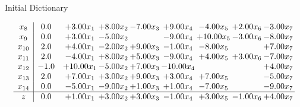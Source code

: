 \documentclass[8pt]{article}
\begin{document}
Initial Dictionary 

\[\begin{array}{c| c c@{\hskip 2pt} c@{\hskip 2pt} c@{\hskip 2pt} c@{\hskip 2pt} c@{\hskip 2pt} c@{\hskip 2pt} c@{\hskip 2pt} }
 x_{8}   &  0.0 & +  3.00 x_{1} & +  8.00 x_{2} & -7.00 x_{3} & +  9.00 x_{4} & -4.00 x_{5} & +  2.00 x_{6} & -3.00 x_{7}\\
 x_{9}   &  0.0 & +  3.00 x_{1} & -5.00 x_{2} &   & -9.00 x_{4} & + 10.00 x_{5} & -3.00 x_{6} & -8.00 x_{7}\\
 x_{10}   &  2.0 & +  4.00 x_{1} & -2.00 x_{2} & +  9.00 x_{3} & -1.00 x_{4} & -8.00 x_{5} &   & +  7.00 x_{7}\\
 x_{11}   &  2.0 & -4.00 x_{1} & +  8.00 x_{2} & +  5.00 x_{3} & -9.00 x_{4} & +  4.00 x_{5} & +  3.00 x_{6} & -7.00 x_{7}\\
 x_{12}   &  -1.0 & + 10.00 x_{1} & -5.00 x_{2} & +  7.00 x_{3} & -10.00 x_{4} &    &   & +  4.00 x_{7}\\
 x_{13}   &  2.0 & +  7.00 x_{1} & +  3.00 x_{2} & +  9.00 x_{3} & +  3.00 x_{4} & +  7.00 x_{5} &   & -5.00 x_{7}\\
 x_{14}   &  0.0 & -5.00 x_{1} & -9.00 x_{2} & +  1.00 x_{3} & +  1.00 x_{4} & -7.00 x_{5} &   & -9.00 x_{7}\\
\hline
z    &  0.0 & +  1.00 x_{1} & +  3.00 x_{2} & +  3.00 x_{3} & -1.00 x_{4} & +  3.00 x_{5} & -1.00 x_{6} & +  4.00 x_{7}\\
\end{array}\]
\end{document}
